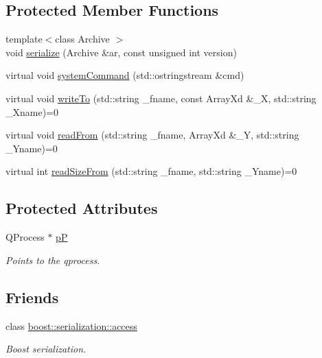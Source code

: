 \subsection*{Protected Member Functions}
\begin{DoxyCompactItemize}
\item 
{\footnotesize template$<$class Archive $>$ }\\void \hyperlink{class_go_s_u_m_1_1_c_exe_evaluator_adccb3c9acae9f916d8be1a9720d5bcc1}{serialize} (Archive \&ar, const unsigned int version)
\item 
virtual void \hyperlink{class_go_s_u_m_1_1_c_exe_evaluator_aeb6c371d09cbc3cb3a0152779a32bf52}{system\-Command} (std\-::ostringstream \&cmd)
\item 
virtual void \hyperlink{class_go_s_u_m_1_1_c_exe_evaluator_acb14cd0bed268c9f34a0fef4f9d8deb6}{write\-To} (std\-::string \-\_\-fname, const Array\-Xd \&\-\_\-\-X, std\-::string \-\_\-\-Xname)=0
\item 
virtual void \hyperlink{class_go_s_u_m_1_1_c_exe_evaluator_af453aa942a20e6494a4cd7685ace1948}{read\-From} (std\-::string \-\_\-fname, Array\-Xd \&\-\_\-\-Y, std\-::string \-\_\-\-Yname)=0
\item 
virtual int \hyperlink{class_go_s_u_m_1_1_c_exe_evaluator_a1f7820ae9bd4795547dca1611769a182}{read\-Size\-From} (std\-::string \-\_\-fname, std\-::string \-\_\-\-Yname)=0
\end{DoxyCompactItemize}
\subsection*{Protected Attributes}
\begin{DoxyCompactItemize}
\item 
Q\-Process $\ast$ \hyperlink{class_go_s_u_m_1_1_c_exe_evaluator_a92e5435e10a507cdc893eec96f7dfae0}{p\-P}
\begin{DoxyCompactList}\small\item\em Points to the qprocess. \end{DoxyCompactList}\end{DoxyCompactItemize}
\subsection*{Friends}
\begin{DoxyCompactItemize}
\item 
class \hyperlink{class_go_s_u_m_1_1_c_exe_evaluator_ac98d07dd8f7b70e16ccb9a01abf56b9c}{boost\-::serialization\-::access}
\begin{DoxyCompactList}\small\item\em Boost serialization. \end{DoxyCompactList}\end{DoxyCompactItemize}
